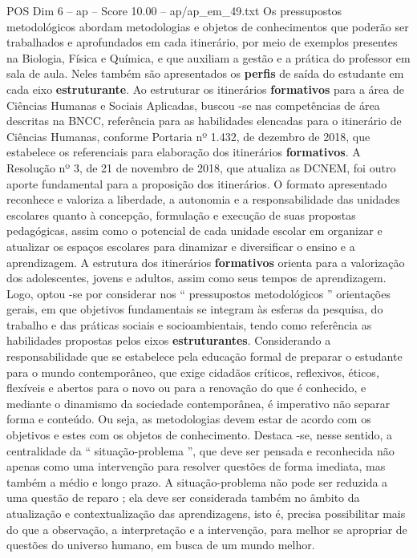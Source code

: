 \begin{textsample}{POS Dim 6 – ap – Score 10.00 – ap/ap\_em\_49.txt}
Os pressupostos metodológicos abordam metodologias e objetos de conhecimentos que poderão ser trabalhados e aprofundados em cada itinerário, por meio de exemplos presentes na Biologia, Física e Química, e que auxiliam a gestão e a prática do professor em sala de aula.
Neles também são apresentados os \textbf{perfis} de saída do estudante em cada eixo \textbf{estruturante}.
Ao estruturar os itinerários \textbf{formativos} para a área de Ciências Humanas e Sociais Aplicadas, buscou -se nas competências de área descritas na BNCC, referência para as habilidades elencadas para o itinerário de Ciências Humanas, conforme Portaria nº 1.432, de dezembro de 2018, que estabelece os referenciais para elaboração dos itinerários \textbf{formativos}.
A Resolução nº 3, de 21 de novembro de 2018, que atualiza as DCNEM, foi outro aporte fundamental para a proposição dos itinerários.
O formato apresentado reconhece e valoriza a liberdade, a autonomia e a responsabilidade das unidades escolares quanto à concepção, formulação e execução de suas propostas pedagógicas, assim como o potencial de cada unidade escolar em organizar e atualizar os espaços escolares para dinamizar e diversificar o ensino e a aprendizagem.
A estrutura dos itinerários \textbf{formativos} orienta para a valorização dos adolescentes, jovens e adultos, assim como seus tempos de aprendizagem.
Logo, optou -se por considerar nos “ pressupostos metodológicos ” orientações gerais, em que objetivos fundamentais se integram às esferas da pesquisa, do trabalho e das práticas sociais e socioambientais, tendo como referência as habilidades propostas pelos eixos \textbf{estruturantes}.
Considerando a responsabilidade que se estabelece pela educação formal de preparar o estudante para o mundo contemporâneo, que exige cidadãos críticos, reflexivos, éticos, flexíveis e abertos para o novo ou para a renovação do que é conhecido, e mediante o dinamismo da sociedade contemporânea, é imperativo não separar forma e conteúdo.
Ou seja, as metodologias devem estar de acordo com os objetivos e estes com os objetos de conhecimento.
Destaca -se, nesse sentido, a centralidade da “ situação-problema ”, que deve ser pensada e reconhecida não apenas como uma intervenção para resolver questões de forma imediata, mas também a médio e longo prazo.
A situação-problema não pode ser reduzida a uma questão de reparo ; ela deve ser considerada também no âmbito da atualização e contextualização das aprendizagens, isto é, precisa possibilitar mais do que a observação, a interpretação e a intervenção, para melhor se apropriar de questões do universo humano, em busca de um mundo melhor.

\end{textsample}
